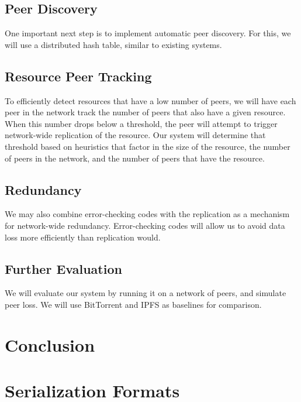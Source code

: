 \documentclass[twocolumn]{article}
\begin{document}
\subsection{Peer Discovery}

One important next step is to implement automatic peer discovery.
For this, we will use a distributed hash table, similar to existing systems.

\subsection{Resource Peer Tracking}

To efficiently detect resources that have a low number of peers, we will have each peer in the network track the number of peers that also have a given resource.
When this number drops below a threshold, the peer will attempt to trigger network-wide replication of the resource.
Our system will determine that threshold based on heuristics that factor in the size of the resource, the number of peers in the network, and the number of peers that have the resource.

\subsection{Redundancy}

We may also combine error-checking codes with the replication as a mechanism for network-wide redundancy.
Error-checking codes will allow us to avoid data loss more efficiently than replication would.

\subsection{Further Evaluation}

We will evaluate our system by running it on a network of peers, and simulate peer loss.
We will use BitTorrent and IPFS as baselines for comparison.

\section{Conclusion}

\clearpage
\appendix

\section{Serialization Formats}
\end{document}
